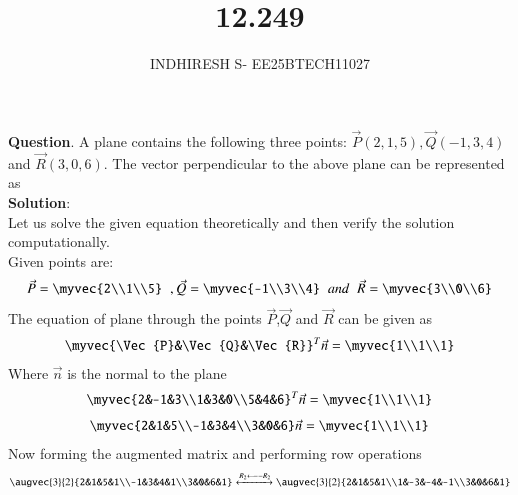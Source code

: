 \documentclass[journal]{IEEEtran}
\theoremstyle{remark}
\begin{document}

\onecolumn

\title{12.249}
\author{INDHIRESH S- EE25BTECH11027}
\maketitle


\renewcommand{\thefigure}{\theenumi}
\renewcommand{\thetable}{\theenumi}

\textbf{Question}. A plane contains the following three points: $\Vec{P}(2, 1, 5), \Vec{Q}(-1, 3, 4)$ and $\Vec{R}(3, 0, 6)$. The vector perpendicular to the above plane can be represented as\\
\textbf{Solution}:\\
Let us solve the given equation theoretically and then verify the solution computationally. \\
Given points are:
\begin{align}
 \Vec{P}=\myvec{2\\1\\5}\;\;,\Vec{Q}=\myvec{-1\\3\\4}\;\;and\;\;\Vec{R}=\myvec{3\\0\\6}
\end{align}
The equation of plane through the points $\Vec{P}$,$\Vec{Q}$ and $\Vec{R}$ can be given as
\begin{align}
\myvec{\Vec{P}&\Vec{Q}&\Vec{R}}^T\Vec{n}=\myvec{1\\1\\1}
\end{align}
Where $\Vec{n}$ is the normal to the plane
\begin{align}
\myvec{2&-1&3\\1&3&0\\5&4&6}^T \Vec{n}=\myvec{1\\1\\1}
\end{align}
\begin{align}
    \myvec{2&1&5\\-1&3&4\\3&0&6} \Vec{n}=\myvec{1\\1\\1}
\end{align}
Now forming the augmented matrix and performing row operations
\begin{align}
   \augvec{3}{2}{2&1&5&1\\-1&3&4&1\\3&0&6&1}\xleftrightarrow{R_2\longleftarrow -R_2} \augvec{3}{2}{2&1&5&1\\1&-3&-4&-1\\3&0&6&1}
\end{align}
\end{document}
